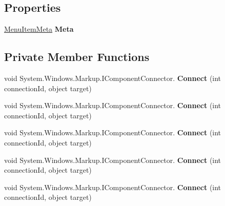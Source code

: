 \subsection*{Properties}
\begin{DoxyCompactItemize}
\item 
\mbox{\hyperlink{class_wpf_handler_1_1_plugins_1_1_menu_item_meta}{Menu\+Item\+Meta}} {\bfseries Meta}
\end{DoxyCompactItemize}
\subsection*{Private Member Functions}
\begin{DoxyCompactItemize}
\item 
\mbox{\label{class_example_plugin1_1_1_sub_plugin2_control_ae678b89caa6aee69f24dbbe2a72f9c28}} 
void System.\+Windows.\+Markup.\+I\+Component\+Connector. {\bfseries Connect} (int connection\+Id, object target)
\item 
\mbox{\label{class_example_plugin1_1_1_sub_plugin2_control_ae678b89caa6aee69f24dbbe2a72f9c28}} 
void System.\+Windows.\+Markup.\+I\+Component\+Connector. {\bfseries Connect} (int connection\+Id, object target)
\item 
\mbox{\label{class_example_plugin1_1_1_sub_plugin2_control_ae678b89caa6aee69f24dbbe2a72f9c28}} 
void System.\+Windows.\+Markup.\+I\+Component\+Connector. {\bfseries Connect} (int connection\+Id, object target)
\item 
\mbox{\label{class_example_plugin1_1_1_sub_plugin2_control_ae678b89caa6aee69f24dbbe2a72f9c28}} 
void System.\+Windows.\+Markup.\+I\+Component\+Connector. {\bfseries Connect} (int connection\+Id, object target)
\item 
\mbox{\label{class_example_plugin1_1_1_sub_plugin2_control_ae678b89caa6aee69f24dbbe2a72f9c28}} 
void System.\+Windows.\+Markup.\+I\+Component\+Connector. {\bfseries Connect} (int connection\+Id, object target)
\end{DoxyCompactItemize}

